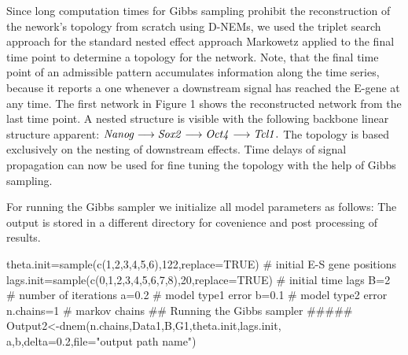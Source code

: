 \documentclass[11pt,a4paper]{article}
\begin{document}
Since long computation times for Gibbs sampling prohibit the reconstruction of the nework's topology 
from scratch using D-NEMs, we used the triplet search approach for the standard nested effect approach Markowetz applied to the final time point to determine a topology for the network. Note, that the final time point of an admissible pattern accumulates information along the time series, because it reports a one whenever a downstream signal has reached the E-gene at any time.  The first network in Figure 1 shows the reconstructed network from the last time point. A nested structure is visible with the following  backbone  linear structure apparent:
$
 \mbox{\textit{Nanog}} \longrightarrow \mbox{\textit{Sox2}} \longrightarrow \mbox{\textit{Oct4}} \longrightarrow \mbox{\textit{Tcl1}}.
$
The topology is based exclusively on the nesting of downstream effects. Time delays of signal propagation 
can now be used for fine tuning the topology with the help of Gibbs sampling. 
\begin{Schunk}
\end{Schunk}

For running the Gibbs sampler we initialize all model parameters as follows:
The output is stored in a different directory for covenience and post processing of results.
\begin{Schunk}
\begin{Sinput}
theta.init=sample(c(1,2,3,4,5,6),122,replace=TRUE) 
 # initial E-S gene positions
lags.init=sample(c(0,1,2,3,4,5,6,7,8),20,replace=TRUE)
# initial time lags
B=2  # number of iterations
a=0.2  # model type1 error
b=0.1  # model type2 error
n.chains=1 # markov chains
## Running the Gibbs sampler #####
Output2<-dnem(n.chains,Data1,B,G1,theta.init,lags.init,
a,b,delta=0.2,file="output path name")
\end{Sinput}
\end{Schunk}
\end{document}
